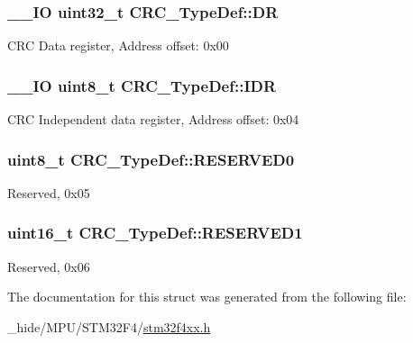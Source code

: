 \subsubsection[{D\+R}]{\setlength{\rightskip}{0pt plus 5cm}\+\_\+\+\_\+\+I\+O uint32\+\_\+t C\+R\+C\+\_\+\+Type\+Def\+::\+D\+R}\label{struct_c_r_c___type_def_a50cb22870dbb9001241cec694994e5ef}
C\+R\+C Data register, Address offset\+: 0x00 \hypertarget{struct_c_r_c___type_def_ad84e8694cd4b5375ee533c2d875c3b5a}{}
\subsubsection[{I\+D\+R}]{\setlength{\rightskip}{0pt plus 5cm}\+\_\+\+\_\+\+I\+O uint8\+\_\+t C\+R\+C\+\_\+\+Type\+Def\+::\+I\+D\+R}\label{struct_c_r_c___type_def_ad84e8694cd4b5375ee533c2d875c3b5a}
C\+R\+C Independent data register, Address offset\+: 0x04 \hypertarget{struct_c_r_c___type_def_a70dfd1730dba65041550ef55a44db87c}{}
\subsubsection[{R\+E\+S\+E\+R\+V\+E\+D0}]{\setlength{\rightskip}{0pt plus 5cm}uint8\+\_\+t C\+R\+C\+\_\+\+Type\+Def\+::\+R\+E\+S\+E\+R\+V\+E\+D0}\label{struct_c_r_c___type_def_a70dfd1730dba65041550ef55a44db87c}
Reserved, 0x05 \hypertarget{struct_c_r_c___type_def_a8b205c6e25b1808ac016db2356b3021d}{}
\subsubsection[{R\+E\+S\+E\+R\+V\+E\+D1}]{\setlength{\rightskip}{0pt plus 5cm}uint16\+\_\+t C\+R\+C\+\_\+\+Type\+Def\+::\+R\+E\+S\+E\+R\+V\+E\+D1}\label{struct_c_r_c___type_def_a8b205c6e25b1808ac016db2356b3021d}
Reserved, 0x06 

The documentation for this struct was generated from the following file\+:\begin{DoxyCompactItemize}
\item 
\+\_\+hide/\+M\+P\+U/\+S\+T\+M32\+F4/\hyperlink{stm32f4xx_8h}{stm32f4xx.\+h}\end{DoxyCompactItemize}
